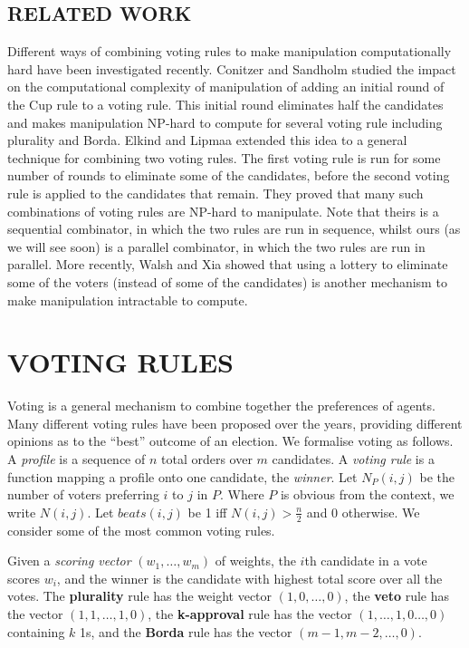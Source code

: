 \documentclass{ecai2012}
\newcommand\lirong[1]{}
\begin{document}
\subsection{RELATED WORK}\lirong{Moved to here.}
Different ways of combining voting rules to make manipulation computationally hard have been investigated recently.
Conitzer and Sandholm
\cite{csijcai03} studied the impact on the
computational complexity of manipulation
of adding an initial round of the Cup rule to a voting
rule.
This initial round eliminates half the candidates and
makes manipulation NP-hard to compute
for several voting rule including plurality and Borda.
Elkind and Lipmaa
\cite{elisaac05} extended this idea to
a general technique for combining two voting rules.
The first voting rule is run for some number
of rounds to eliminate some of the candidates,
before the second voting rule is applied to
the candidates that remain. They proved that
many such combinations of voting rules are NP-hard
to manipulate.
Note that theirs is a sequential combinator,
in which the two rules are run in sequence,
whilst ours (as we will see soon) is a parallel combinator,
in which the two rules are run in parallel.
More recently, Walsh and Xia
\cite{wxaamas12} showed that
using a lottery to eliminate some of the voters
(instead of some of the candidates) is another
mechanism to make manipulation intractable to compute.

\section{VOTING RULES}

Voting is a general mechanism to combine together
the preferences of agents.
Many different voting rules have been proposed
over the years, providing
different opinions as to the ``best''
outcome of an election. We formalise voting as follows.
A {\em profile} is a sequence of $n$ total orders over $m$ candidates.
A {\em voting rule} is a function mapping a profile
onto one candidate, the {\em winner}.
Let $N_P(i,j)$ be
the number of voters preferring $i$ to $j$ in $P$.
Where $P$ is obvious from the context, we write $N(i,j)$.
Let $beats(i,j)$ be 1 iff $N(i,j) > \frac{n}{2}$
and 0 otherwise.
We consider some of the most common voting rules.

 Given a {\em scoring vector}
$(w_1,\ldots,w_m)$
of weights, the $i$th candidate in a vote
scores $w_i$, and the winner is the candidate with
highest total score over all the votes.
The {\bf plurality} rule has
the weight vector $(1,0,\ldots,0)$,
the {\bf veto} rule has
the vector $(1,1,\ldots,1,0)$,
the {\bf k-approval} rule has
the vector $(1,\ldots,1,0\ldots,0)$
containing $k$ 1s,
and
the {\bf Borda} rule has the vector $(m-1,m-2,\ldots,0)$.
\end{document}
